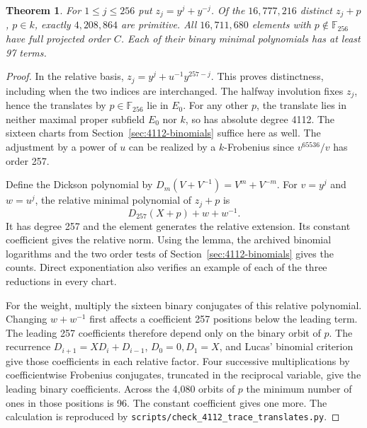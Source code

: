 \documentclass[11pt]{article}
\newtheorem{theorem}{Theorem}
\begin{document}
\begin{theorem}
For \(1\le j\le256\) put \(z_j=y^j+y^{-j}\). Of the
\(16{,}777{,}216\) distinct \(z_j+p\), \(p\in k\), exactly
\(4{,}208{,}864\) are primitive. All \(16{,}711{,}680\) elements
with \(p\notin\mathbb F_{256}\) have full projected order \(C\).
Each of their binary minimal polynomials has at least 97 terms.
\end{theorem}
\begin{proof}
In the relative basis,
\(z_j=y^j+u^{-1}y^{257-j}\). This proves distinctness, including
when the two indices are interchanged. The halfway involution fixes
\(z_j\), hence the translates by \(p\in\mathbb F_{256}\) lie in
\(E_0\). For any other \(p\), the translate lies in neither maximal
proper subfield \(E_0\) nor \(k\), so has absolute degree 4112.
The sixteen charts from Section~\ref{sec:4112-binomials} suffice
here as well. The adjustment by a power of \(u\) can be realized by
a \(k\)-Frobenius since \(v^{65536}/v\) has order 257.

Define the Dickson polynomial by \(D_m(V+V^{-1})=V^m+V^{-m}\).
For \(v=y^j\) and \(w=u^j\), the relative minimal polynomial of
\(z_j+p\) is
\[
                    D_{257}(X+p)+w+w^{-1}.
\]
It has degree 257 and the element generates the relative extension.
Its constant coefficient gives the relative norm.
Using the lemma, the archived binomial logarithms and the two
order tests of Section~\ref{sec:4112-binomials} gives the counts.
Direct exponentiation also verifies an example of each of the three
reductions in every chart.

For the weight, multiply the sixteen binary conjugates of this
relative polynomial. Changing \(w+w^{-1}\) first affects a
coefficient 257 positions below the leading term. The leading 257
coefficients therefore depend only on the binary orbit of \(p\).
The recurrence \(D_{i+1}=XD_i+D_{i-1}\), \(D_0=0,D_1=X\),
and Lucas' binomial criterion give those coefficients in each
relative factor. Four successive multiplications by coefficientwise
Frobenius conjugates, truncated in the reciprocal variable, give
the leading binary coefficients. Across the 4,080 orbits of \(p\)
the minimum number of ones in those positions is 96. The constant
coefficient gives one more. The calculation is reproduced by
\nolinkurl{scripts/check_4112_trace_translates.py}.
\end{proof}
\end{document}
